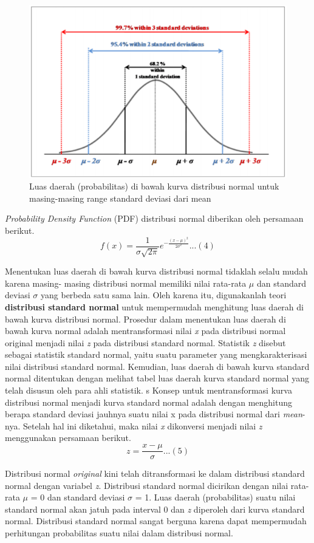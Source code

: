 \documentclass[
]{book}
\begin{document}
\begin{figure}

{\centering \includegraphics[width=0.5\linewidth]{images/screening/distribusi_normal_range} 

}

\caption{Luas daerah (probabilitas) di bawah kurva distribusi normal untuk masing-masing range standard deviasi dari mean}\label{fig:unnamed-chunk-6}
\end{figure}

\emph{
Probability Density Function} (PDF) distribusi normal diberikan oleh persamaan berikut. \[f(x)=\frac{1}{\sigma\sqrt{2\pi}}e^{-\frac{(x-\mu)^2}{2\sigma^2}}...(4)\]

Menentukan luas daerah di bawah kurva distribusi normal tidaklah selalu mudah karena masing- masing distribusi normal memiliki nilai rata-rata \(\mu\) dan standard deviasi \(\sigma\) yang berbeda satu sama lain. Oleh karena itu, digunakanlah teori \textbf{distribusi standard normal} untuk mempermudah menghitung luas daerah di bawah kurva distribusi normal. Prosedur dalam menentukan luas daerah di bawah kurva normal adalah mentransformasi nilai \emph{x} pada distribusi normal original menjadi nilai \emph{z} pada distribusi standard normal. Statistik \emph{z} disebut sebagai statistik standard normal, yaitu suatu parameter yang mengkarakterisasi nilai distribusi standard normal. Kemudian, luas daerah di bawah kurva standard normal ditentukan dengan melihat tabel luas daerah kurva standard normal yang telah disusun oleh para ahli statistik.
s
Konsep untuk mentransformasi kurva distribusi normal menjadi kurva standard normal adalah dengan menghitung berapa standard deviasi jauhnya suatu nilai x pada distribusi normal dari \emph{mean}-nya. Setelah hal ini diketahui, maka nilai \emph{x} dikonversi menjadi nilai \emph{z} menggunakan persamaan berikut. \[z=\frac{x-\mu}{\sigma}...(5)\]

Distribusi normal \emph{original} kini telah ditransformasi ke dalam distribusi standard normal dengan variabel \emph{z}. Distribusi standard normal dicirikan dengan nilai rata-rata \(\mu\) = 0 dan standard deviasi \(\sigma\) = 1. Luas daerah (probabilitas) suatu nilai standard normal akan jatuh pada interval 0 dan \emph{z} diperoleh dari kurva standard normal. Distribusi standard normal sangat berguna karena dapat mempermudah perhitungan probabilitas suatu nilai dalam distribusi normal.
\end{document}
